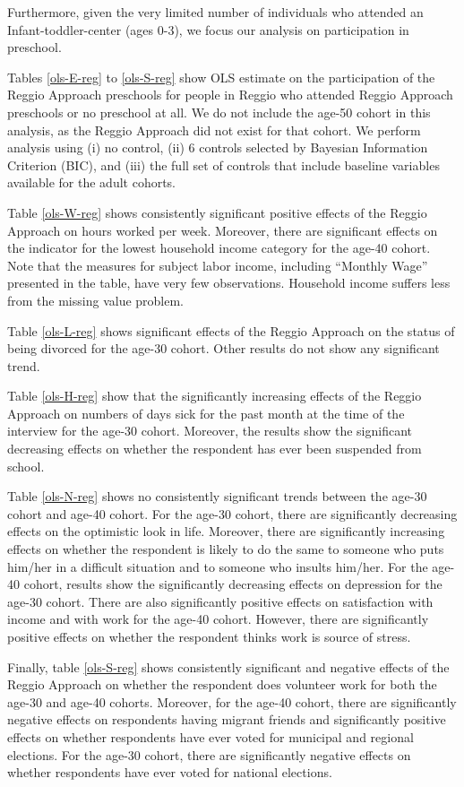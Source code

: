 \documentclass[12pt]{article}
\begin{document}
Furthermore, given the very limited number of individuals who attended an Infant-toddler-center (ages 0-3), we focus our analysis on participation in preschool.

Tables \ref{ols-E-reg} to \ref{ols-S-reg} show OLS estimate on the participation of the Reggio Approach preschools for people in Reggio who attended Reggio Approach preschools or no preschool at all. We do not include the age-50 cohort in this analysis, as the Reggio Approach did not exist for that cohort. We perform analysis using (i) no control, (ii) 6 controls selected by Bayesian Information Criterion (BIC), and (iii) the full set of controls that include baseline variables available for the adult cohorts. 


Table \ref{ols-W-reg} shows consistently significant positive effects of the Reggio Approach on hours worked per week. Moreover, there are significant effects on the indicator for the lowest household income category for the age-40 cohort. Note that the measures for subject labor income, including ``Monthly Wage'' presented in the table, have very few observations. Household income suffers less from the missing value problem.

Table \ref{ols-L-reg} shows significant effects of the Reggio Approach on the status of being divorced for the age-30 cohort. Other results do not show any significant trend. 

Table \ref{ols-H-reg} show that the significantly increasing effects of the Reggio Approach on numbers of days sick for the past month at the time of the interview for the age-30 cohort. Moreover, the results show the significant decreasing effects on whether the respondent has ever been suspended from school. 

Table \ref{ols-N-reg} shows no consistently significant trends between the age-30 cohort and age-40 cohort. For the age-30 cohort, there are significantly decreasing effects on the optimistic look in life. Moreover, there are significantly increasing effects on whether the respondent is likely to do the same to someone who puts him/her in a difficult situation and to someone who insults him/her.
For the age-40 cohort, results show the significantly decreasing effects on depression for the age-30 cohort. There are also significantly positive effects on satisfaction with income and with work for the age-40 cohort. However, there are significantly positive effects on whether the respondent thinks work is source of stress. 

Finally, table \ref{ols-S-reg} shows consistently significant and negative effects of the Reggio Approach on whether the respondent does volunteer work for both the age-30 and age-40 cohorts. Moreover, for the age-40 cohort, there are significantly negative effects on respondents having migrant friends and significantly positive effects on whether respondents have ever voted for municipal and regional elections. For the age-30 cohort, there are significantly negative effects on whether respondents have ever voted for national elections.
\end{document}
